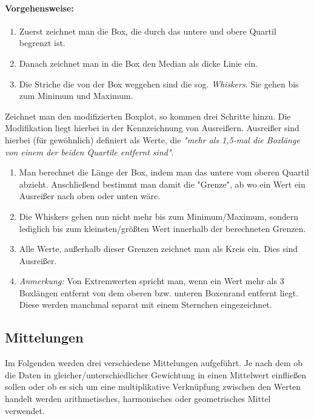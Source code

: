 \documentclass[a4paper]{article}
\begin{document}
\paragraph{Vorgehensweise:}
\begin{enumerate}
    \item Zuerst zeichnet man die Box, die durch das untere und obere Quartil begrenzt ist.
    \item Danach zeichnet man in die Box den Median als dicke Linie ein.
    \item Die Striche die von der Box weggehen sind die sog. \textit{Whiskers}. Sie gehen bis zum Minimum und Maximum.
\end{enumerate}
Zeichnet man den modifizierten Boxplot, so kommen drei Schritte hinzu. Die Modifikation liegt hierbei in der Kennzeichnung von Ausreißern. Ausreißer sind hierbei (für gewöhnlich) definiert als Werte, die \textit{"mehr als 1,5-mal die Boxlänge von einem der beiden Quartile entfernt sind"}.
\begin{enumerate}
    \item Man berechnet die Länge der Box, indem man das untere vom oberen Quartil abzieht. Anschließend bestimmt man damit die "Grenze", ab wo ein Wert ein Ausreißer nach oben oder unten wäre.
    \item Die Whiskers gehen nun nicht mehr bis zum Minimum/Maximum, sondern lediglich bis zum kleinsten/größten Wert innerhalb der berechneten Grenzen.
    \item Alle Werte, außerhalb dieser Grenzen zeichnet man als Kreis ein. Dies sind Ausreißer.
    \item \textit{Anmerkung:} Von Extremwerten spricht man, wenn ein Wert mehr als 3 Boxlängen entfernt von dem oberen bzw. unteren Boxenrand entfernt liegt. Diese werden manchmal separat mit einem Sternchen eingezeichnet.
\end{enumerate}

\noindent {}

\subsection{Mittelungen}
Im Folgenden werden drei verschiedene Mittelungen aufgeführt. Je nach dem ob die Daten in gleicher/unterschiedlicher Gewichtung in einen Mittelwert einfließen sollen oder ob es sich um eine multiplikative Verknüpfung zwischen den Werten handelt werden arithmetisches, harmonisches oder geometrisches Mittel verwendet.
\end{document}
